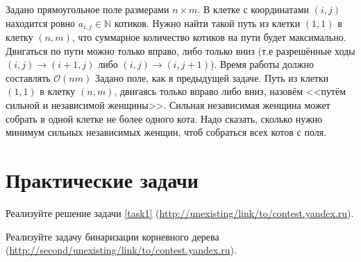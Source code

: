 \documentclass[addpoints]{exam}
\begin{document}
\begin{questions}
\question[1] Задано прямоугольное поле размерами $n \times m$. В клетке с координатами $(i,j)$ находится ровно $a_{i,j} \in \mathbb{N}$ котиков. Нужно найти такой путь из клетки $(1,1)$ в клетку $(n, m)$, что суммарное количество котиков на пути будет максимально. Двигаться по пути можно только вправо, либо только вниз (т.е разрешённые ходы $(i,j) \rightarrow (i+1,j)$ либо $(i,j) \rightarrow (i, j+1)$). Время работы должно составлять $\mathcal{O}(nm)$   
\question Задано поле, как в предыдущей задаче. Путь из клетки $(1,1)$ в клетку $(n,m)$, двигаясь только вправо либо вниз, назовём <<путём сильной и независимой женщины>>. Сильная независимая женщина может собрать в одной клетке не более одного кота. Надо сказать, сколько нужно минимум сильных независимых женщин, чтоб собраться всех котов с поля.


\section{Практические задачи}

\question[1] Реализуйте решение задачи \ref{task1} (\url{http://unexisting/link/to/contest.yandex.ru}).

\question[1] Реализуйте задачу бинаризации корневного дерева
(\url{http://second/unexisting/link/to/contest.yandex.ru}).

\end{questions}


\begin{center}
\pointtable[h][questions]
\end{center}
\end{document}
